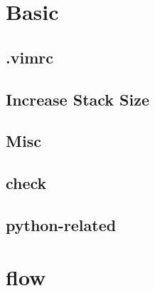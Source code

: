\documentclass[a4paper,10pt,twocolumn,oneside]{article}
\begin{document}
\pagestyle{fancy}
\fancyfoot{}
\fancyhead[R]{\thepage}
\renewcommand{\headrulewidth}{0.4pt}
\renewcommand{\contentsname}{Contents} 

\scriptsize
\tableofcontents


\section{Basic}
\subsection{.vimrc}


\subsection{Increase Stack Size}


% 

\subsection{Misc}


\subsection{check}


\subsection{python-related}


% 

\section{flow}
\end{document}

